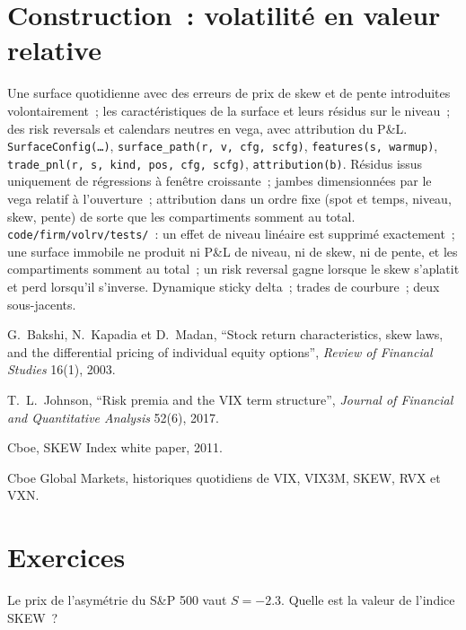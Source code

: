 \section{Construction~: volatilité en valeur relative}\label{bld:s2:skew-and-term-structure-relative-value:volrv}

\begin{build}
 Une surface quotidienne avec des erreurs de prix de skew et de pente introduites volontairement~; les caractéristiques de la surface et leurs résidus sur le niveau~; des
risk reversals et calendars neutres en vega, avec attribution du P\&L.
 \texttt{SurfaceConfig(\dots)}, \texttt{surface\_path(r, v, cfg, scfg)}, \texttt{features(s, warmup)},
\texttt{trade\_pnl(r, s, kind, pos, cfg, scfg)}, \texttt{attribution(b)}.
 Résidus issus uniquement de régressions à fenêtre croissante~; jambes dimensionnées par le vega relatif à l'ouverture~; attribution dans un ordre fixe (spot et temps,
niveau, skew, pente) de sorte que les compartiments somment au total.
 \texttt{code/firm/volrv/tests/}~: un effet de niveau linéaire est supprimé exactement~; une surface immobile ne produit ni P\&L de niveau, ni de skew, ni de pente,
et les compartiments somment au total~; un risk reversal gagne lorsque le skew s'aplatit et perd lorsqu'il s'inverse.
 Dynamique sticky delta~; trades de courbure~; deux sous-jacents.
\end{build}

\begin{omsources}
\item G.~Bakshi, N.~Kapadia et D.~Madan, ``Stock return characteristics, skew laws, and the differential pricing of individual equity options'',
\emph{Review of Financial Studies} 16(1), 2003.
\item T.~L.~Johnson, ``Risk premia and the VIX term structure'', \emph{Journal of Financial and Quantitative Analysis} 52(6), 2017.
\item Cboe, SKEW Index white paper, 2011.
\item Cboe Global Markets, historiques quotidiens de VIX, VIX3M, SKEW, RVX et VXN.
\end{omsources}

\section{Exercices}

\begin{exercise}[$\star$]\label{exo:s2:skew-and-term-structure-relative-value:1}
Le prix de l'asymétrie du S\&P 500 vaut $S = -2.3$. Quelle est la valeur de l'indice SKEW~?
\end{exercise}


